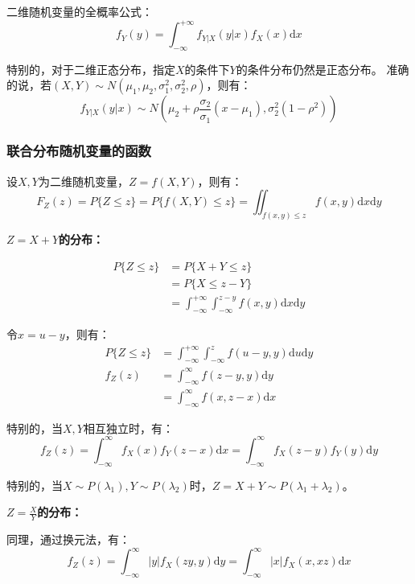 \documentclass[a4paper,12pt]{ctexart}
\begin{document}
二维随机变量的全概率公式：
\begin{equation*}
	f_Y(y) = \int_{-\infty}^{+\infty}f_{Y|X}(y|x)f_X(x)\mathrm{d}x
\end{equation*}

特别的，对于二维正态分布，指定$X$的条件下$Y$的条件分布仍然是正态分布。
准确的说，若$(X,Y) \sim N(\mu_1,\mu_2,\sigma_1^2,\sigma_2^2,\rho)$，则有：
\begin{equation*}
	f_{Y|X}(y|x) \sim N\left(\mu_2 + \rho\frac{\sigma_2}{\sigma_1}(x-\mu_1),\sigma_2^2(1-\rho^2)\right)
\end{equation*}

\subsubsection{联合分布随机变量的函数}

设$X,Y$为二维随机变量，$Z = f(X,Y)$，则有：
\begin{equation*}
	F_Z(z) = P\{Z \leq z\} = P\{f(X,Y) \leq z\} = \iint_{f(x,y) \leq z}f(x,y)\mathrm{d}x\mathrm{d}y
\end{equation*}

\textbf{$Z = X + Y$的分布：}

\begin{align*}
	P\{Z \leq z\} &= P\{X + Y \leq z\} \\
	&= P\{X \leq z - Y\} \\
	&= \int_{-\infty}^{+\infty}\int_{-\infty}^{z-y}f(x,y)\mathrm{d}x\mathrm{d}y
\end{align*}

令$x = u - y$，则有：
\begin{align*}
	P\{Z \leq z\} &= \int_{-\infty}^{+\infty} \int_{-\infty}^{z} f(u-y,y)\mathrm{d}u\mathrm{d}y \\
	f_Z(z) &= \int_{-\infty}^{\infty} f(z-y,y)\mathrm{d}y \\
	&= \int_{-\infty}^{\infty} f(x,z-x)\mathrm{d}x
\end{align*}

特别的，当$X,Y$相互独立时，有：
\begin{equation*}
	f_Z(z) = \int_{-\infty}^{\infty} f_X(x)f_Y(z-x)\mathrm{d}x = \int_{-\infty}^{\infty} f_X(z-y)f_Y(y)\mathrm{d}y
\end{equation*}

特别的，当$X \sim P(\lambda_1), Y \sim P(\lambda_2)$时，$Z = X + Y \sim P(\lambda_1 + \lambda_2)$。

\textbf{$Z = \frac{X}{Y}$的分布：}

同理，通过换元法，有：
\begin{equation*}
	f_Z(z) = \int_{-\infty}^{\infty} |y|f_X(zy,y)\mathrm{d}y = \int_{-\infty}^{\infty} |x|f_X(x,xz)\mathrm{d}x
\end{equation*}
\end{document}
